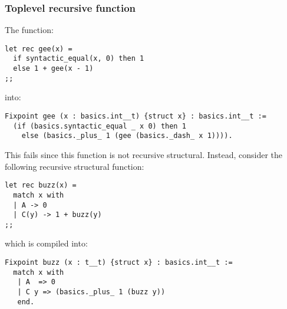 \subsubsection{Toplevel recursive function}
The function:
{\footnotesize
\begin{lstlisting}
let rec gee(x) =
  if syntactic_equal(x, 0) then 1
  else 1 + gee(x - 1)
;;
\end{lstlisting}
}

\noindent into:

{\footnotesize
\begin{lstlisting}[language=MyCoq]
Fixpoint gee (x : basics.int__t) {struct x} : basics.int__t :=
  (if (basics.syntactic_equal _ x 0) then 1
    else (basics._plus_ 1 (gee (basics._dash_ x 1)))).
\end{lstlisting}
}

This fails since this function is not recursive structural. Instead,
consider the following recursive structural function:

{\footnotesize
\begin{lstlisting}
let rec buzz(x) =
  match x with
  | A -> 0
  | C(y) -> 1 + buzz(y)
;;
\end{lstlisting}
}

\noindent which is compiled into:

{\footnotesize
\begin{lstlisting}[language=MyCoq]
Fixpoint buzz (x : t__t) {struct x} : basics.int__t :=
  match x with
   | A  => 0
   | C y => (basics._plus_ 1 (buzz y))
   end.
\end{lstlisting}
}
